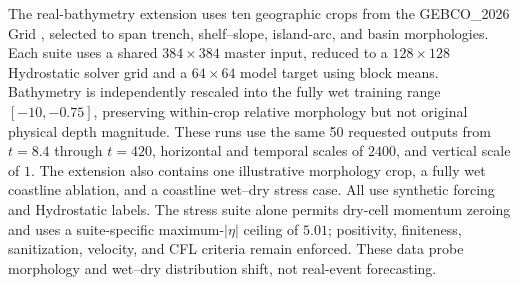 The real-bathymetry extension uses ten geographic crops from the GEBCO\_2026 Grid \citep{gebco2026}, selected to span trench, shelf--slope, island-arc, and basin morphologies. Each suite uses a shared $384 \times 384$ master input, reduced to a $128 \times 128$ Hydrostatic solver grid and a $64 \times 64$ model target using block means. Bathymetry is independently rescaled into the fully wet training range $[-10, -0.75]$, preserving within-crop relative morphology but not original physical depth magnitude. These runs use the same 50 requested outputs from $t=8.4$ through $t=420$, horizontal and temporal scales of $2400$, and vertical scale of $1$. The extension also contains one illustrative morphology crop, a fully wet coastline ablation, and a coastline wet--dry stress case. All use synthetic forcing and Hydrostatic labels. The stress suite alone permits dry-cell momentum zeroing and uses a suite-specific maximum-$|\eta|$ ceiling of $5.01$; positivity, finiteness, sanitization, velocity, and CFL criteria remain enforced. These data probe morphology and wet--dry distribution shift, not real-event forecasting.
